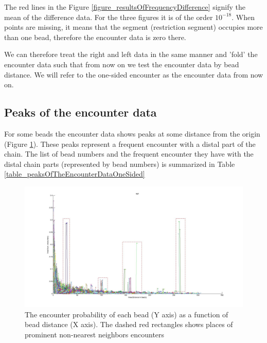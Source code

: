 \documentclass[12pt]{book}
\begin{document}
The red lines in the Figure \ref{figure_resultsOfFrequencyDifference} signify the mean of the difference data. For the three figures it is of the order $10^{-18}$. When points are missing, it means that the segment (restriction segment) occupies more than one bead, therefore the encounter data is zero there. 

We can therefore treat the right and left data in the same manner and 'fold' the encounter data such that from now on we test the encounter data by bead distance. We will refer to the one-sided encounter as the encounter data from now on. 

\subsection{Peaks of the encounter data}\label{subsection_peaksOfTheEncounterData}
For some beads the encounter data shows peaks at some distance from the origin (Figure \ref{figure_peaksOfTheEncounterProbabiltity307Beads}). 
These peaks represent a frequent encounter with a distal part of the chain. The list of bead numbers and the frequent encounter they have with the distal chain parts (represented by bead numbers) is summarized in Table \ref{table_peaksOfTheEncounterDataOneSided}

\begin{figure}[H]
\includegraphics*[scale=0.2]{EncounterFrequenciesByDistanceRep1}
\caption{\scriptsize{The encounter probability of each bead (Y axis) as a function of bead distance (X axis). The dashed red rectangles shows places of prominent non-nearest neighbors encounters}}
\label{figure_peaksOfTheEncounterProbabiltity307Beads}
\end{figure}
\end{document}
